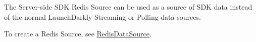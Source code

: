 \label{index_md_docs_doc}%
%
 The Server-\/side SDK Redis Source can be used as a source of SDK data instead of the normal Launch\+Darkly Streaming or Polling data sources.

To create a Redis Source, see \mbox{\hyperlink{classlaunchdarkly_1_1server__side_1_1integrations_1_1RedisDataSource}{Redis\+Data\+Source}}. 